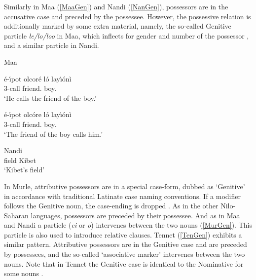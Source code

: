 Similarly in Maa (\ref{MaaGen}) and Nandi (\ref{NanGen}), possessors are in the accusative case and preceded by the possessee. 
However, the possessive relation is additionally marked by some extra material, namely, the so-called Genitive particle \emph{le/lo/loo} in Maa, which inflects for gender and number of the possessor , and a similar particle \emph{} in Nandi. 

\begin{exe}\ex\label{MaaGen} {Maa} \nopagebreak[4]
\begin{xlist}
\ex\gll \'e-\'\i pot olcor\'e l\'o lay\'\i\'on\`i\\
3\sg{}-call friend.\acc{} \poss{} boy.\acc{}\\
`He calls the friend of the boy.'

\ex\gll \'e-\'\i pot olc\'ore l\'o lay\'\i\'on\`i\\
3\sg{}-call friend.\nom{} \poss{} boy.\acc{}\\
`The friend of the boy calls him.'
\end{xlist}
\end{exe}

\begin{exe}\ex\label{NanGen} {Nandi} \citep[Nilotic; Kenya; ][69]{Creider:1989}\nopagebreak[4]
\gll {}  \\
field \poss{} Kibet\\
`Kibet's field'
\end{exe}


In Murle, attributive possessors are in a special case-form, dubbed as `Genitive' in accordance with traditional Latinate case naming conventions. 
If a modifier follows the Genitive noun, the case-ending is dropped \citep[53--54]{Arensen:1982}. 
As in the other Nilo-Saharan languages, possessors are preceded by their possessee. 
And as in Maa and Nandi a particle (\emph{ci} or \emph{o}) intervenes between the two nouns (\ref{MurGen}).
This particle is also used to introduce relative clauses. 
Tennet (\ref{TenGen}) exhibits a similar pattern. 
Attributive possessors are in the Genitive case and are preceded by possessees, and the so-called `associative marker' intervenes between the two nouns. 
Note that in Tennet the Genitive case is identical to the Nominative  for some nouns \citep[225]{Randal:1998}. 

